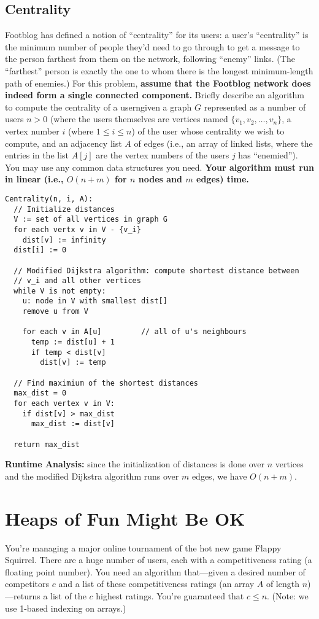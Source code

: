 \documentclass[11pt, oneside]{article}   	%
\theoremstyle{definition}
\theoremstyle{remark}
\begin{document}
\subsection{Centrality}
Footblog has defined a notion of ``centrality'' for its users: a user's ``centrality'' is the minimum number of people they'd need to go through to get a message to the person farthest from them on the network, following ``enemy'' links. (The ``farthest'' person is exactly the one to whom there is the longest minimum-length path of enemies.)
For this problem, \textbf{assume that the Footblog network does indeed form a single connected component.}
Briefly describe an algorithm to compute the centrality of a userngiven a graph $G$ represented as a number of users $n > 0$ (where the users themselves are vertices named $\{v_1, v_2, \ldots, v_n\}$, a vertex number $i$ (where $1 \leq i \leq n$) of the user whose centrality we wish to compute, and an adjacency list $A$ of edges (i.e., an array of linked lists, where the entries in the list $A[j]$ are the vertex numbers of the users $j$ has ``enemied''). You may use any common data structures you need. \textbf{Your algorithm must run in linear (i.e., $O(n + m)$ for $n$ nodes and $m$ edges) time.}
\begin{verbatim}
Centrality(n, i, A):
  // Initialize distances
  V := set of all vertices in graph G
  for each vertx v in V - {v_i}
    dist[v] := infinity
  dist[i] := 0
  
  // Modified Dijkstra algorithm: compute shortest distance between
  // v_i and all other vertices
  while V is not empty:
    u: node in V with smallest dist[]
    remove u from V
    
    for each v in A[u]		   // all of u's neighbours
      temp := dist[u] + 1
      if temp < dist[v]
        dist[v] := temp
  
  // Find maximium of the shortest distances
  max_dist = 0
  for each vertex v in V:
    if dist[v] > max_dist
      max_dist := dist[v]
    
  return max_dist
\end{verbatim}
\textbf{Runtime Analysis:} since the initialization of distances is done over $n$ vertices and the modified Dijkstra algorithm runs over $m$ edges, we have $O(n+m)$.


\cleardoublepage
\section{Heaps of Fun Might Be OK}
You're managing a major online tournament of the hot new game Flappy
Squirrel. There are a huge number of users, each with a
competitiveness rating (a floating point number). You need an
algorithm that---given a desired number of competitors $c$ and a list
of these competitiveness ratings (an array $A$ of length
$n$)---returns a list of the $c$ highest ratings. You're guaranteed
that $c \leq n$. (Note: we use 1-based indexing on arrays.)
\end{document}
